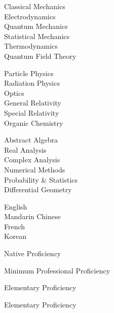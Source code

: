 \begin{minipage}[t]{0.75\textwidth}
	\vspace*{4pt}
	{
		\begin{minipage}[t]{0.30\textwidth}
			Classical Mechanics\\
			Electrodynamics\\
			Quantum Mechanics\\
			Statistical Mechanics\\
			Thermodynamics\\
			Quantum Field Theory
		\end{minipage}
		\begin{minipage}[t]{0.30\textwidth}
			Particle Physics\\
			Radiation Physics\\
			Optics\\
			General Relativity\\
			Special Relativity\\
			Organic Chemistry
		\end{minipage}
		\begin{minipage}[t]{0.30\textwidth}
			Abstract Algebra\\
			Real Analysis\\
			Complex Analysis\\
			Numerical Methods\\
			Probability \& Statistics\\
			Differential Geometry
		\end{minipage}
	}

	\vspace*{4pt}
	{
		\begin{minipage}[t]{0.30\textwidth}
			English\\
			Mandarin Chinese\\
			French\\
			Korean
		\end{minipage}
		\begin{minipage}[t]{0.20\textwidth}
		\end{minipage}
		\begin{minipage}[t]{0.63\textwidth}
			\hfill Native Proficiency

			\hfill Minimum Professional Proficiency

			\hfill Elementary Proficiency

			\hfill Elementary Proficiency
		\end{minipage}
	}
\end{minipage}

\vspace{8pt}

